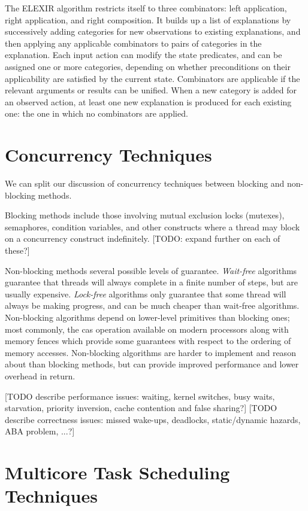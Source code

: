 The ELEXIR algorithm restricts itself to three combinators: left application, right application, and right composition. It builds up a list of explanations by successively adding categories for new observations to existing explanations, and then applying any applicable combinators to pairs of categories in the explanation. Each input action can modify the state predicates, and can be assigned one or more categories, depending on whether preconditions on their applicability are satisfied by the current state. Combinators are applicable if the relevant arguments or results can be unified. When a new category is added for an observed action, at least one new explanation is produced for each existing one: the one in which no combinators are applied.

\section{Concurrency Techniques}

We can split our discussion of concurrency techniques between blocking and non-blocking methods.

Blocking methods include those involving mutual exclusion locks (mutexes), semaphores, condition variables, and other constructs where a thread may block on a concurrency construct indefinitely. [TODO: expand further on each of these?]

Non-blocking methods several possible levels of guarantee. \emph{Wait-free} algorithms guarantee that threads will always complete in a finite number of steps, but are usually expensive. \emph{Lock-free} algorithms only guarantee that some thread will always be making progress, and can be much cheaper than wait-free algorithms. Non-blocking algorithms depend on lower-level primitives than blocking ones; most commonly, the \ac{cas} operation available on modern processors along with memory fences which provide some guarantees with respect to the ordering of memory accesses. Non-blocking algorithms are harder to implement and reason about than blocking methods, but can provide improved performance and lower overhead in return.

[TODO describe performance issues: waiting, kernel switches, busy waits, starvation, priority inversion, cache contention and false sharing?]
[TODO describe correctness issues: missed wake-ups, deadlocks, static/dynamic hazards, ABA problem, ...?]

\section{Multicore Task Scheduling Techniques}

